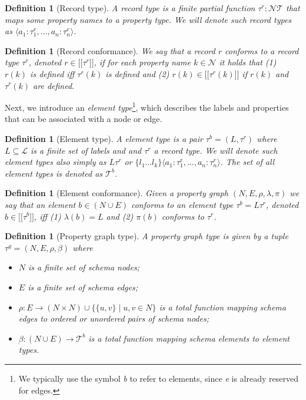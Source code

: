 \documentclass[a4paper]{article}
\makeatletter
\newtheorem{definition}[theorem]{Definition}
\newcommand{\N}{\mathbb{N}}
\newcommand{\ptypes}{\mathcal{T}}
\newcommand{\rtype}{\tau^r}
\newcommand{\btype}{\tau^b}
\newcommand{\btypes}{\mathcal{T}^b}
\newcommand{\gtype}{\tau^g}
\newcommand{\lsem}{\ensuremath{[\![}}
\newcommand{\rsem}{\ensuremath{]\!]}}
\newcommand{\sem}[1]{\ensuremath{\lsem #1 \rsem}}
\newcommand{\pto}{}%
\DeclareRobustCommand{\pto}{\mathrel{\mathpalette\p@to@gets\to}}
\newcommand{\p@to@gets}[2]{%
  \ooalign{\hidewidth$\m@th#1\mapstochar\mkern5mu$\hidewidth\cr$\m@th#1\to$\cr}%
}
\makeatother
\begin{document}
\begin{definition}[Record type]
  A \emph{record type} is a finite partial function $\rtype : \mathcal{N} \pto \ptypes$ that maps some property names to a property type. We will denote such record types as $\langle a_1 : \rtype_1, \ldots, a_n : \rtype_n \rangle$.
\end{definition}

\begin{definition}[Record conformance]
  We say that a record $r$ \emph{conforms} to a record type $\rtype$, denoted $r \in \sem{\rtype}$, if for each property name $k \in \mathcal{N}$ it holds that (1) $r(k)$ is defined iff $\rtype(k)$ is defined and (2) $r(k) \in \sem{\rtype(k)}$ if $r(k)$ and $\rtype(k)$ are defined.
\end{definition}

Next, we introduce an \emph{element type}\footnote{We typically use the symbol \emph{b} to refer to elements, since \emph{e} is already reserved for edges.}, which describes the labels and properties that can be associated with a node or edge.

\begin{definition}[Element type]
  A \emph{element type} is a pair $\btype = (L, \rtype)$ where $L \subseteq \mathcal{L}$ is a finite set of labels and and $\rtype$ a record type. We will denote such element types also simply as $L\rtype$ or $\{ l_1 \ldots l_k \} \langle a_1 : \rtype_1, \ldots, a_n : \rtype_n \rangle$. The set of all element types is denoted as $\btypes$.
\end{definition}

\begin{definition}[Element conformance]
  Given a property graph $(N, E, \rho, \lambda, \pi)$ we say that an element $b \in (N \cup E)$ \emph{conforms} to an element type $\btype = L\rtype$, denoted $b \in \sem{\btype}$, iff (1) $\lambda(b) = L$ and (2) $\pi(b)$ conforms to $\rtype$.
\end{definition}

\begin{definition}[Property graph type]
  A \emph{property graph type} is given by a tuple $\gtype = (N, E, \rho, \beta)$ where 
  \begin{itemize}
    \item $N$ is a finite set of schema nodes;
    \item $E$ is a finite set of schema edges;
    \item $\rho : E \to (N \times N) \cup \{\{u, v\} \mid u, v \in N\}$ is a total function mapping schema edges to ordered or unordered pairs of schema nodes;
    \item $\beta : (N \cup E) \to \btypes$ is a total function mapping schema elements to element types.
  \end{itemize}
\end{definition}
\end{document}
